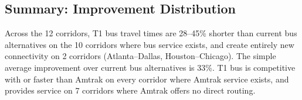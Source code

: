 \subsection{Summary: Improvement Distribution}

Across the 12 corridors, T1 bus travel times are 28--45\% shorter than current bus alternatives on the 10 corridors where bus service exists, and create entirely new connectivity on 2 corridors (Atlanta--Dallas, Houston--Chicago). The simple average improvement over current bus alternatives is 33\%. T1 bus is competitive with or faster than Amtrak on every corridor where Amtrak service exists, and provides service on 7 corridors where Amtrak offers no direct routing.
